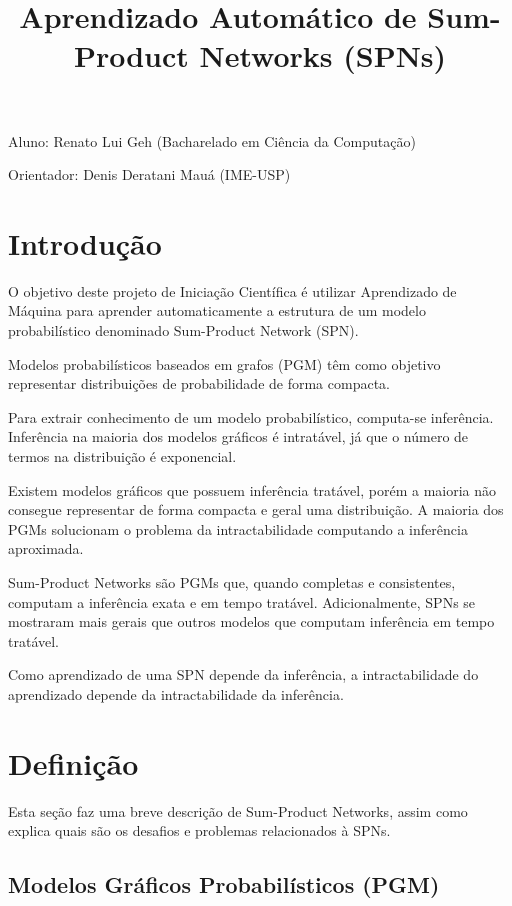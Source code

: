 \documentclass[a4paper,10pt]{article}
\title{\textbf{Aprendizado Automático de Sum-Product Networks (SPNs)}}
\theoremstyle{plain}
\begin{document}
\date{}
\author{}
\vspace*{-40pt}
{\let\newpage\relax\maketitle}

Aluno: Renato Lui Geh (Bacharelado em Ciência da Computação)

Orientador: Denis Deratani Mauá (IME-USP)

\section{Introdução}

O objetivo deste projeto de Iniciação Científica é utilizar Aprendizado de Máquina para aprender
automaticamente a estrutura de um modelo probabilístico denominado Sum-Product Network (SPN).

Modelos probabilísticos baseados em grafos (PGM) têm como objetivo representar distribuições de
probabilidade de forma compacta.

Para extrair conhecimento de um modelo probabilístico, computa-se inferência. Inferência na
maioria dos modelos gráficos é intratável, já que o número de termos na distribuição é exponencial.

Existem modelos gráficos que possuem inferência tratável, porém a maioria não consegue representar
de forma compacta e geral uma distribuição. A maioria dos PGMs solucionam o problema da
intractabilidade computando a inferência aproximada.

Sum-Product Networks são PGMs que, quando completas e consistentes, computam a inferência exata e
em tempo tratável. Adicionalmente, SPNs se mostraram mais gerais que outros modelos que computam
inferência em tempo tratável.\cite{poon-domingos}

Como aprendizado de uma SPN depende da inferência, a intractabilidade do aprendizado depende da
intractabilidade da inferência.

\section{Definição}

Esta seção faz uma breve descrição de Sum-Product Networks, assim como explica quais são os
desafios e problemas relacionados à SPNs.

\subsection{Modelos Gráficos Probabilísticos (PGM)}
\end{document}

